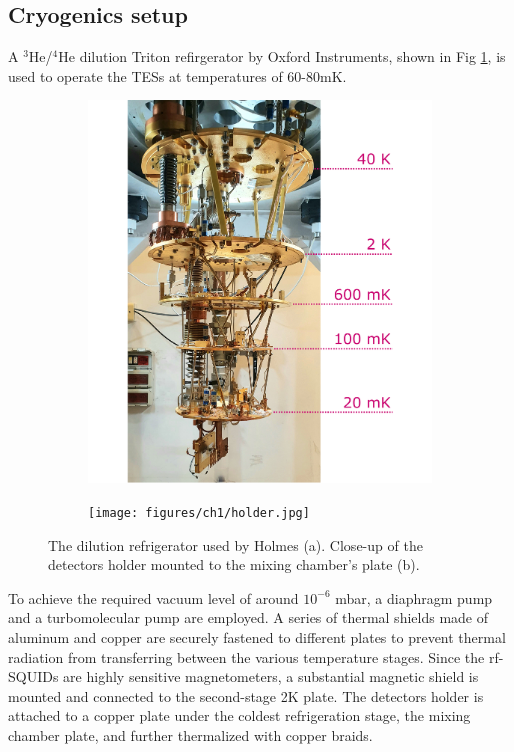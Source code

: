 \subsection{Cryogenics setup}

A $^3$He/$^4$He dilution Triton refirgerator by Oxford Instruments, shown in Fig \ref{fig:cryo},  is used to operate the
TESs at temperatures of
60-80mK. \begin{figure}[!b]
    \begin{subfigure}[b]{0.45\linewidth}
\includegraphics[width=\linewidth]{figures/ch1/cryo.jpg}
\caption{}
\end{subfigure}
\hfill
\begin{subfigure}[b]{0.45\linewidth}
    \texttt{[image: figures/ch1/holder.jpg]}
\caption{}
\end{subfigure}
\caption{The dilution refrigerator used by Holmes (a). Close-up of the detectors holder mounted to the mixing
chamber's plate (b).} 
\label{fig:cryo}
\end{figure}
To achieve the required vacuum level of around $10^{-6}$ mbar, a diaphragm pump and a turbomolecular pump are employed. A series of thermal shields made of aluminum and copper are securely fastened to different plates to prevent thermal radiation from transferring between the various temperature stages.
Since the rf-SQUIDs are highly sensitive magnetometers, a substantial magnetic shield is mounted and connected to the
second-stage 2K plate. The detectors holder is attached to a copper plate under the coldest
refrigeration stage, the mixing chamber plate, and further thermalized with copper braids. 


